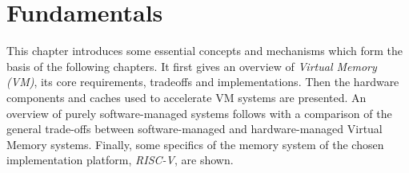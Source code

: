 \chapter{Fundamentals} %
\label{chap:fund}

%


This chapter introduces some essential concepts and mechanisms which form the basis of the following
chapters. It first gives an overview of \textit{Virtual Memory (VM)}, its core requirements,
tradeoffs and implementations.
Then the hardware components and caches used to accelerate VM systems are
presented.
An overview of purely software-managed systems follows with a comparison of the general trade-offs
between software-managed and hardware-managed Virtual Memory systems.
Finally, some specifics of the memory system of the chosen implementation platform, \textit{RISC-V},
are shown.

